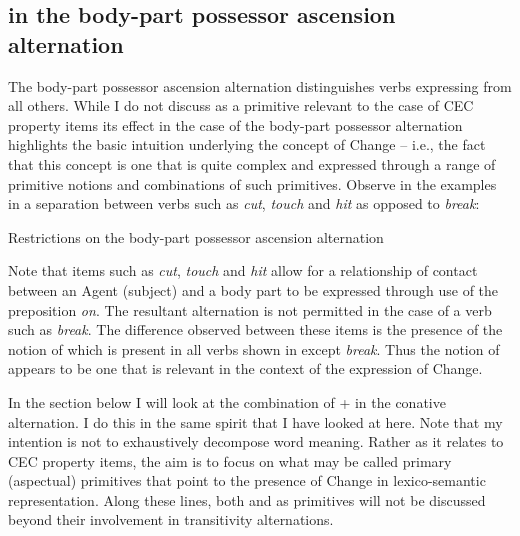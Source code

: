 \subsection{\CONTACT in the body-part possessor ascension
  alternation}\label{sec:4.4.2}

The body-part possessor ascension alternation distinguishes verbs
expressing \CONTACT from all others.  While I do not discuss \CONTACT as
a primitive relevant to the case of CEC property items its effect in
the case of the body-part possessor alternation highlights the basic
intuition underlying the concept of Change -- i.e., the fact that this
concept is one that is quite complex and expressed through a range of
primitive notions and combinations of such primitives.  Observe in the
examples in  a separation between verbs such as \textit{cut},
\textit{touch} and \textit{hit} as opposed to \textit{break}:

\ea\label{ex:4:17}Restrictions on the body-part possessor ascension
alternation \citep[7]{Levin1993}

\z \z

Note that items such as \textit{cut}, \textit{touch} and \textit{hit} allow for a
relationship of contact between an Agent (subject) and a body part to
be expressed through use of the preposition \textit{on}.  The resultant
alternation is not permitted in the case of a verb such as \textit{break}.
The difference observed between these items is the presence of the
notion of \CONTACT which is present in all verbs shown in 
except \textit{break}.  Thus the notion of \CONTACT appears to be one that is
relevant in the context of the expression of Change.

In the section below I will look at the combination of \MOTION +
\CONTACT in the conative alternation.  I do this in the same spirit
that I have looked at \CONTACT here.  Note that my intention is not to
exhaustively decompose word meaning.  Rather as it relates to CEC
property items, the aim is to focus on what may be called primary
(aspectual) primitives that point to the presence of Change in
lexico-semantic representation.  Along these lines, both \CONTACT and
\MOTION as primitives will not be discussed beyond their involvement in
transitivity alternations.

